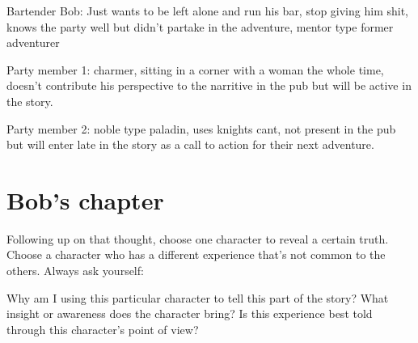 \documentclass[oneside]{book}
\begin{document}
Bartender Bob: Just wants to be left alone and run his bar, stop giving him shit, knows the party well but didn't partake in the adventure, mentor type former adventurer 

Party member 1: charmer, sitting in a corner with a woman the whole time, doesn't contribute his perspective to the narritive in the pub but will be active in the story. 

Party member 2: noble type paladin, uses knights cant, not present in the pub but will enter late in the story as a call to action for their next adventure. 



\chapter{Bob's chapter}

Following up on that thought, choose one character to reveal a certain truth. Choose a character who has a different experience that’s not common to the others. Always ask yourself:

Why am I using this particular character to tell this part of the story?
What insight or awareness does the character bring?
Is this experience best told through this character’s point of view?
\end{document}
